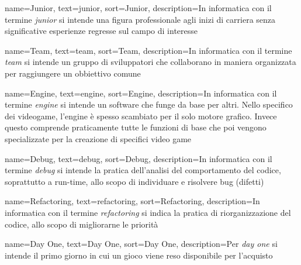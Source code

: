 
\renewcommand{\acronymname}{Acronimi e abbreviazioni}





{
	name=Junior,
	text=junior,
	sort=Junior,
	description={In informatica con il termine \emph{junior} si intende una figura professionale agli inizi di carriera senza significative esperienze regresse sul campo di interesse}
}

{
	name=Team,
	text=team,
	sort=Team,
	description={In informatica con il termine \emph{team} si intende un gruppo di sviluppatori che collaborano in maniera organizzata per raggiungere un obbiettivo comune}
}

{
	name=Engine,
	text=engine,
	sort=Engine,
	description={In informatica con il termine \emph{engine} si intende un software che funge da base per altri. Nello specifico dei videogame, l'engine è spesso scambiato per il solo motore grafico. Invece questo comprende praticamente tutte le funzioni di base che poi vengono specializzate per la creazione di specifici video game}
}

{
	name=Debug,
	text=debug,
	sort=Debug,
	description={In informatica con il termine \emph{debug} si intende la pratica dell'analisi del comportamento del codice, soprattutto a run-time, allo scopo di individuare e risolvere bug (difetti)}
}

{
	name=Refactoring,
	text=refactoring,
	sort=Refactoring,
	description={In informatica con il termine \emph{refactoring} si indica la pratica di riorganizzazione del codice, allo scopo di migliorarne le priorità}
}

{
	name=Day One,
	text=Day One,
	sort=Day One,
	description={Per \emph{day one} si intende il primo giorno in cui un gioco viene reso disponibile per l'acquisto}
}

